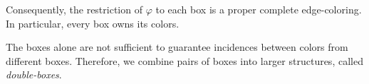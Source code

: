 \documentclass{article}
\newcommand{\Z}{\mathbb{Z}}
\newcommand{\blue}[1]{\textcolor{blue}{#1}}
\newcommand{\red}[1]{\textcolor{red}{#1}}
\def\greeen{\textcolor[RGB]{47, 141, 26 }}
\begin{document}
Consequently, the restriction of $\varphi$ to each box is a proper complete edge-coloring. In particular, every box owns its colors.

The boxes alone are not sufficient to guarantee incidences between colors from different boxes. Therefore, we combine pairs of boxes into larger structures, called \emph{double-boxes}.
\end{document}
